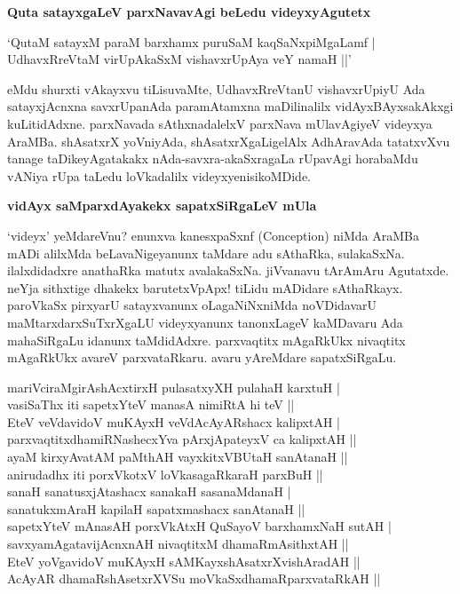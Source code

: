 {\bigskip
\noindent
{\large\bf Quta satayxgaLeV parxNavavAgi beLedu videyxyAgutetx}}\label{page87}
\smallskip

\begin{shloka}
`QutaM satayxM paraM barxhamx puruSaM kaqSaNxpiMgaLamf |\\\label{87}
UdhavxRreVtaM virUpAkaSxM vishavxrUpAya veY namaH ||'
\end{shloka}

\noindent
eMdu shurxti vAkayxvu tiLisuvaMte, UdhavxRreVtanU vishavxrUpiyU Ada satayxjAcnxna savxrUpanAda para\-mAtamxna maDilinalilx vidAyxBAyxsakAkxgi kuLitidAdxne. parxNavada sAthxnadalelxV parxNava mUlavAgiyeV videyxya AraMBa. shAsatxrX yoVniyAda, shAsatxrXgaLigelAlx AdhAravAda tatatxvXvu tanage taDikeyAgatakakx nAda-savxra-akaSxra\-gaLa rUpavAgi horabaMdu vANiya rUpa taLedu loVkadalilx videyxyenisikoMDide.

{\bigskip
\noindent
{\large\bf vidAyx saMparxdAyakekx sapatxSiRgaLeV mUla}}
\medskip

\noindent
`videyx' yeMdareVnu? enunxva kanesxpaSxnf ({\rm Conception}) niMda AraMBa mADi alilxMda beLavaNige\-yanunx taMdare adu sAthaRka, sulakaSxNa. ilalxdidadxre anathaRka matutx avalakaSxNa. jiVvanavu tArAmAru Agu\-tatxde. neYja sithxtige dhakekx barutetxVpApx! tiLidu mADidare sAthaRkayx. paroVkaSx pirxyarU satayxvanunx oLagaNiNx\-niMda noVDidavarU maMtarxdarxSuTxrXgaLU videyxyanunx tanonxLageV kaMDavaru Ada mahaSiRgaLu idanunx taMdi\-dAdxre. parxvaqtitx mAgaRkUkx nivaqtitx mAgaRkUkx avareV parxvataRkaru. avaru yAreMdare sapatxSiRgaLu.

\begin{shloka}
mariVciraMgirAshAcxtirxH pulasatxyXH pulahaH karxtuH |\\\label{88}
vasiSaThx iti sapetxYteV manasA nimiRtA hi teV ||\\[.15cm]

EteV veVdavidoV muKAyxH veVdAcAyARshacx kalipxtAH |\\
parxvaqtitxdhamiRNashecxYva pArxjApateyxV ca kalipxtAH ||\\[.15cm]

ayaM kirxyAvatAM paMthAH vayxkitxVBUtaH sanAtanaH ||\\
anirudadhx iti porxVkotxV loVkasagaRkaraH parxBuH ||\\[.15cm]

sanaH sanatusxjAtashacx sanakaH sasanaMdanaH |\\
sanatukxmAraH kapilaH sapatxmashacx sanAtanaH ||\\[.15cm]

sapetxYteV mAnasAH porxVkAtxH QuSayoV barxhamxNaH sutAH |\\
savxyamAgatavijAcnxnAH nivaqtitxM dhamaRmAsithxtAH ||\\[.15cm]

EteV yoVgavidoV muKAyxH sAMKayxshAsatxrXvishAradAH ||\\
AcAyAR dhamaRshAsetxrXVSu moVkaSxdhamaRparxvataRkAH ||
\end{shloka}

